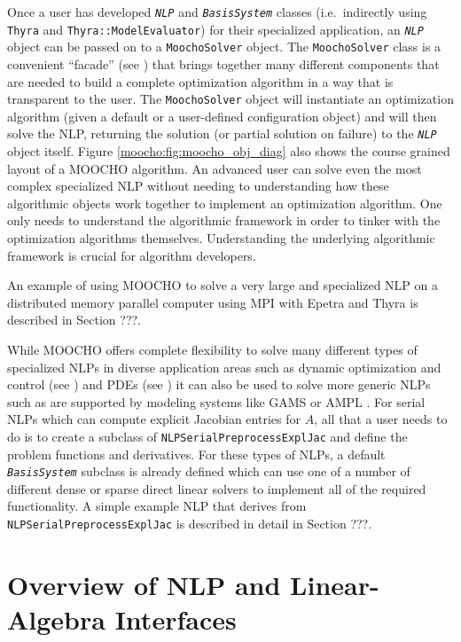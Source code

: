 \documentclass[pdf,ps2pdf,11pt]{SANDreport}
\begin{document}
Once a user has developed {}\texttt{\textit{NLP}} and
{}\texttt{\textit{BasisSystem}} classes (i.e.\ indirectly using
{}\texttt{Thyra} and {}\texttt{Thyra::ModelEvaluator}) for their specialized
application, an {}\texttt{\textit{NLP}} object can be passed on to a
{}\texttt{Moocho\-Solver} object.  The {}\texttt{Moocho\-Solver} class is a
convenient ``facade'' (see {}\cite{ref:gama_et_al_1995}) that brings together
many different components that are needed to build a complete optimization
algorithm in a way that is transparent to the user.  The
{}\texttt{Moocho\-Solver} object will instantiate an optimization algorithm
(given a default or a user-defined configuration object) and will then solve
the NLP, returning the solution (or partial solution on failure) to the
{}\texttt{\textit{NLP}} object itself.  Figure
{}\ref{moocho:fig:moocho_obj_diag} also shows the course grained layout of a
MOOCHO algorithm.  An advanced user can solve even the most complex
specialized NLP without needing to understanding how these algorithmic objects
work together to implement an optimization algorithm.  One only needs to
understand the algorithmic framework in order to tinker with the optimization
algorithms themselves.  Understanding the underlying algorithmic framework is
crucial for algorithm developers.

An example of using MOOCHO to solve a very large and specialized NLP on a
distributed memory parallel computer using MPI with Epetra and Thyra is
described in Section ???.

While MOOCHO offers complete flexibility to solve many different types of
specialized NLPs in diverse application areas such as dynamic optimization and
control (see {}\cite{ref:biegler_et_al_2001}) and PDEs (see
{}\cite{ref:biros_1999}) it can also be used to solve more generic NLPs such
as are supported by modeling systems like GAMS {}\cite{ref:brooke_gams_1997}
or AMPL {}\cite{ref:ampl_1993}.  For serial NLPs which can compute explicit
Jacobian entries for $A$, all that a user needs to do is to create a subclass
of {}\texttt{NLPSerialPreprocessExplJac} and define the problem functions and
derivatives.  For these types of NLPs, a default
{}\texttt{\textit{BasisSystem}} subclass is already defined which can use one
of a number of different dense or sparse direct linear solvers to implement
all of the required functionality.  A simple example NLP that derives from
{}\texttt{NLPSerialPreprocessExplJac} is described in detail in Section ???.

%
\section{Overview of NLP and Linear-Algebra Interfaces}
\label{moocho:sec:nlp_and_lin_alg_itfc}
%
\end{document}
